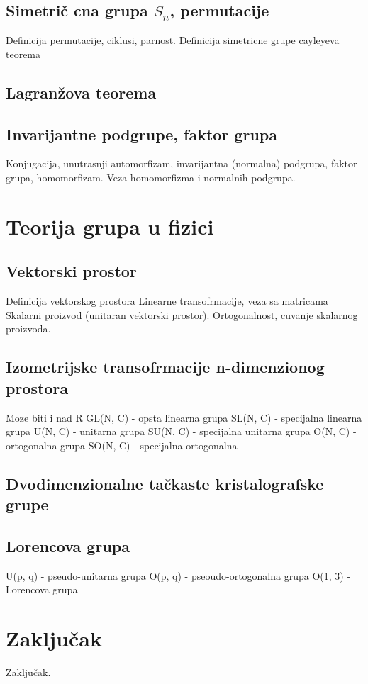\documentclass[times, utf8, diplomski]{fer}
\begin{document}
\section{Simetri\v{c} cna grupa $S_n$, permutacije}
Definicija permutacije, ciklusi, parnost. 
Definicija simetricne grupe
cayleyeva teorema
\section{Lagran\v{z}ova teorema}
\section{Invarijantne podgrupe, faktor grupa}
Konjugacija, unutrasnji automorfizam, invarijantna (normalna) podgrupa, faktor grupa, homomorfizam.
Veza homomorfizma i normalnih podgrupa.

\chapter{Teorija grupa u fizici}
\section{Vektorski prostor}
Definicija vektorskog prostora
Linearne transofrmacije, veza sa matricama
Skalarni proizvod (unitaran vektorski prostor).
Ortogonalnost, cuvanje skalarnog proizvoda.
\section{Izometrijske transofrmacije n-dimenzionog prostora}
Moze biti i nad R
GL(N, C) - opsta linearna grupa
SL(N, C) - specijalna linearna grupa
U(N, C) - unitarna grupa
SU(N, C) - specijalna unitarna grupa
O(N, C) - ortogonalna grupa
SO(N, C) - specijalna ortogonalna
\section{Dvodimenzionalne ta\v{c}kaste kristalografske grupe}
\section{Lorencova grupa}
U(p, q) - pseudo-unitarna grupa
O(p, q) - pseoudo-ortogonalna grupa
O(1, 3) - Lorencova grupa

\chapter{Zaključak}
Zaključak.



\end{document}
